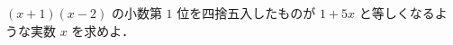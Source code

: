 \documentclass[../../main.tex]{subfiles}
\begin{document}
$(x+1)(x-2)$ の小数第 $1$ 位を四捨五入したものが $1+5x$ と等しくなるような実数 $x$ を求めよ．
\end{document}
